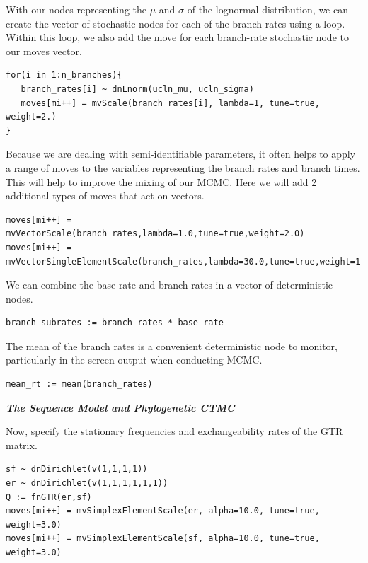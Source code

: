 With our nodes representing the $\mu$ and $\sigma$ of the lognormal distribution, we can create the vector of stochastic nodes for each of the branch rates using a  loop. 
Within this loop, we also add the move for each branch-rate stochastic node to our moves vector.
{\tt \begin{snugshade*}
\begin{lstlisting}
for(i in 1:n_branches){
   branch_rates[i] ~ dnLnorm(ucln_mu, ucln_sigma)
   moves[mi++] = mvScale(branch_rates[i], lambda=1, tune=true, weight=2.)
}
\end{lstlisting}
\end{snugshade*}}

Because we are dealing with semi-identifiable parameters, it often helps to apply a range of moves to the variables representing the branch rates and branch times. This will help to improve the mixing of our MCMC.
Here we will add 2 additional types of moves that act on vectors.
{\tt \begin{snugshade*}
\begin{lstlisting}
moves[mi++] = mvVectorScale(branch_rates,lambda=1.0,tune=true,weight=2.0) 
moves[mi++] = mvVectorSingleElementScale(branch_rates,lambda=30.0,tune=true,weight=1.0) 
\end{lstlisting}
\end{snugshade*}}

We can combine the base rate and branch rates in a vector of deterministic nodes.
{\tt \begin{snugshade*}
\begin{lstlisting}
branch_subrates := branch_rates * base_rate
\end{lstlisting}
\end{snugshade*}}

The mean of the branch rates is a convenient deterministic node to monitor, particularly in the screen output when conducting MCMC.
{\tt \begin{snugshade*}
\begin{lstlisting}
mean_rt := mean(branch_rates) 
\end{lstlisting}
\end{snugshade*}}

\textbf{\textit{The Sequence Model and Phylogenetic CTMC}}

Now, specify the stationary frequencies and exchangeability rates of the GTR matrix.
{\tt \begin{snugshade*}
\begin{lstlisting}
sf ~ dnDirichlet(v(1,1,1,1))
er ~ dnDirichlet(v(1,1,1,1,1,1))
Q := fnGTR(er,sf)
moves[mi++] = mvSimplexElementScale(er, alpha=10.0, tune=true, weight=3.0)
moves[mi++] = mvSimplexElementScale(sf, alpha=10.0, tune=true, weight=3.0)
\end{lstlisting}
\end{snugshade*}}

